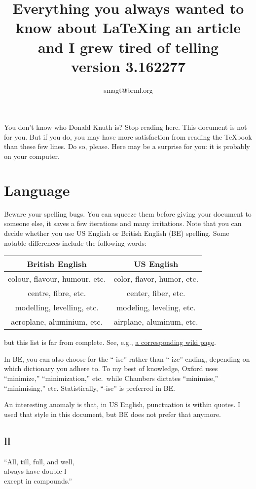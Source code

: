 \documentclass{article}
\title{Everything you always wanted to know about \LaTeX ing an article 
and I grew tired of telling\\[1ex]
\footnotesize{version 3.162277}}
\author{smagt@brml.org}
\begin{document}
\maketitle

You don't know who Donald Knuth is?  Stop reading here.  This document is 
not for you.  But if you do, you may have more satisfaction from reading 
the \TeX book than these few lines.   Do so, please. Here may be a surprise for you: it is probably on your computer.

\section{Language}
Beware your spelling bugs.  You can squeeze them before giving your document to someone else, it saves a few iterations and many irritations.  Note that you can decide whether you use US English or British English (BE) spelling.  Some notable differences include the following words:
\begin{center}\begin{tabular}{c|c}
British English & US English \\\hline
colour, flavour, humour, etc.	& color, flavor, humor, etc.\\
centre, fibre, etc.	& center, fiber, etc.\\
modelling, levelling, etc.		& modeling, leveling, etc.\\
aeroplane, aluminium, etc.			& airplane, aluminum, etc.
\end{tabular}\end{center}
but this list is far from complete.  See, e.g., \href{http://en.wikipedia.org/wiki/American_and_British_English_spelling_differences}{a corresponding wiki page}.

In BE, you can also choose for the ``-ise'' rather than ``-ize'' ending, depending on which dictionary you adhere to.  To my best of knowledge, Oxford uses ``minimize,'' ``minimization,'' etc.\ while Chambers dictates ``minimise,'' ``minimising,'' etc.  Statistically, ``-ise'' is preferred in BE.

An interesting anomaly is that, in US English, punctuation is within quotes.   I used that style in this document, but BE does not prefer that anymore.


\subsection{ll}
``All, till, full, and well, \\
always have double l\\
except in compounds.''
\end{document}
